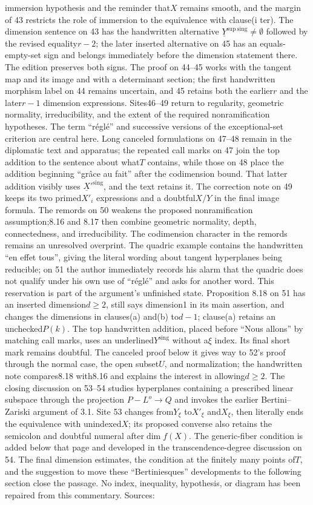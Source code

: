 immersion hypothesis and the reminder that$X$ remains smooth, and the margin of 43 restricts the role of immersion to the equivalence with clause(i ter). The dimension sentence on 43 has the handwritten alternative $\underline{Y}^{\mathrm{sup\ sing}}\neq\emptyset$ followed by the revised equality$r-2$; the later inserted alternative on 45 has an equals-empty-set sign and belongs immediately before the dimension statement there. The edition preserves both signs. The proof on 44--45 works with the tangent map and its image and with a determinant section; the first handwritten morphism label on 44 remains uncertain, and 45 retains both the earlier$r$ and the later$r-1$ dimension expressions. Sites46--49 return to regularity, geometric normality, irreducibility, and the extent of the required nonramification hypotheses. The term ``réglé'' and successive versions of the exceptional-set criterion are central here. Long canceled formulations on 47--48 remain in the diplomatic text and apparatus; the repeated call marks on 47 join the top addition to the sentence about what$T$ contains, while those on 48 place the addition beginning ``grâce au fait'' after the codimension bound. That latter addition visibly uses $\underline{X}'^{\mathrm{sing}}$, and the text retains it. The correction note on 49 keeps its two primed$X'_i$ expressions and a doubtful$X/Y$ in the final image formula. The remords on 50 weakens the proposed nonramification assumption;8.16 and 8.17 then combine geometric normality, depth, connectedness, and irreducibility. The codimension character in the remords remains an unresolved overprint. The quadric example contains the handwritten ``en effet tous'', giving the literal wording about tangent hyperplanes being reducible; on 51 the author immediately records his alarm that the quadric does not qualify under his own use of ``réglé'' and asks for another word. This reservation is part of the argument's unfinished state. Proposition 8.18 on 51 has an inserted dimension$d\geq2$, still says dimension1 in its main assertion, and changes the dimensions in clauses(a) and(b) to$d-1$; clause(a) retains an unchecked$P(k)$. The top handwritten addition, placed before ``Nous allons'' by matching call marks, uses an underlined$Y^{\mathrm{sing}}$ without a$\xi$ index. Its final short mark remains doubtful. The canceled proof below it gives way to 52's proof through the normal case, the open subset$U$, and normalization; the handwritten note compares8.18 with8.16 and explains the interest in allowing$d\geq2$. The closing discussion on 53--54 studies hyperplanes containing a prescribed linear subspace through the projection $P-L^o\to Q$ and invokes the earlier Bertini--Zariski argument of 3.1. Site 53 changes from$Y_\xi$ to$X'_\xi$ and$X_\xi$, then literally ends the equivalence with unindexed$X$; its proposed converse also retains the semicolon and doubtful numeral after$\dim f(X)$. The generic-fiber condition is added below that page and developed in the transcendence-degree discussion on 54. The final dimension estimates, the condition at the finitely many points of$T$, and the suggestion to move these ``Bertiniesques'' developments to the following section close the passage. No index, inequality, hypothesis, or diagram has been repaired from this commentary. Sources: 
